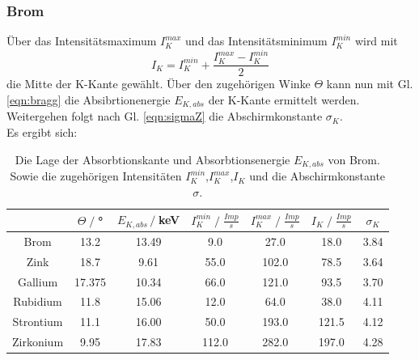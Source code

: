 \subsubsection{Brom}
Über das Intensitätsmaximum $I_K^{max}$ und das Intensitätsminimum $I_K^{min}$
wird mit
\begin{equation}
    I_K=I_K^{min}+\frac{I_K^{max}-I_K^{min}}{2}
    \label{eqn:intensität}
\end{equation}
die Mitte der K-Kante gewählt. Über den zugehörigen Winke $\Theta$ kann nun mit
Gl. \ref{eqn:bragg} die Absibrtionenergie $E_{K,abs}$ der K-Kante ermittelt werden.
Weitergehen folgt nach Gl. \ref{eqn:sigmaZ} die Abschirmkonstante $\sigma_K$.\\
Es ergibt sich:
\begin{table}
    \centering
    \begin{tabular}{c | c c c c c c}
        \toprule
        &$\Theta\;/\;$° & $E_{K,abs}\,/\;$keV & $I_K^{min}\;/\;\frac{Imp}{s}$ & $I_K^{max}\;/\;\frac{Imp}{s}$ & $I_K\;/\;\frac{Imp}{s}$ & $\sigma_K$\\
        \midrule
        Brom & 13.2 & 13.49 & 9.0 & 27.0 & 18.0 & 3.84\\
        Zink & 18.7 & 9.61 & 55.0 & 102.0 & 78.5 & 3.64\\
        Gallium & 17.375 & 10.34 & 66.0 & 121.0 & 93.5 & 3.70\\
        Rubidium & 11.8 & 15.06 & 12.0 & 64.0 & 38.0 & 4.11\\
        Strontium & 11.1 & 16.00 & 50.0 & 193.0 & 121.5 & 4.12\\
        Zirkonium & 9.95 & 17.83 & 112.0 & 282.0 & 197.0 & 4.28\\
        \bottomrule
    \end{tabular}
    \caption{Die Lage der Absorbtionskante und Absorbtionsenergie $E_{K,abs}$ von Brom.
        Sowie die zugehörigen Intensitäten $I_K^{min}$,$I_K^{max}$,$I_K$ und die Abschirmkonstante $\sigma$.}
\end{table}


\label{sec:Auswertung}
